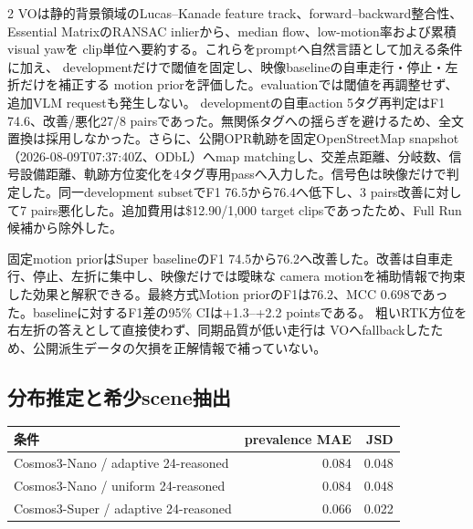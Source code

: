 \documentclass[9pt,a4paper]{extarticle}
\begin{document}
\begin{multicols}{2}
VOは静的背景領域のLucas--Kanade feature track、forward--backward整合性、
Essential MatrixのRANSAC inlierから、median flow、low-motion率および累積visual yawを
clip単位へ要約する。これらをpromptへ自然言語として加える条件に加え、
developmentだけで閾値を固定し、映像baselineの自車走行・停止・左折だけを補正する
motion priorを評価した。evaluationでは閾値を再調整せず、追加VLM requestも発生しない。
developmentの自車action 5タグ再判定はF1 74.6、改善/悪化27/8 pairsであった。無関係タグへの揺らぎを避けるため、全文置換は採用しなかった。さらに、公開OPR軌跡を固定OpenStreetMap snapshot\cite{openstreetmap2026}（2026-08-09T07:37:40Z、ODbL）へmap matchingし、交差点距離、分岐数、信号設備距離、軌跡方位変化を4タグ専用passへ入力した。信号色は映像だけで判定した。同一development subsetでF1 76.5から76.4へ低下し、3 pairs改善に対して7 pairs悪化した。追加費用は\$12.90/1,000 target clipsであったため、Full Run候補から除外した。
\begin{center}
\label{tab:public-motion}
\scriptsize
{}
\end{center}
固定motion priorはSuper baselineのF1 74.5から76.2へ改善した。改善は自車走行、停止、左折に集中し、映像だけでは曖昧な
camera motionを補助情報で拘束した効果と解釈できる。最終方式Motion priorのF1は76.2、MCC 0.698であった。baselineに対するF1差の95\% CIは+1.3--+2.2 pointsである。 粗いRTK方位を右左折の答えとして直接使わず、同期品質が低い走行は
VOへfallbackしたため、公開派生データの欠損を正解情報で補っていない。

\subsection{分布推定と希少scene抽出}
\begin{center}
\centering
{}
\label{tab:distribution}
\scriptsize
\begin{tabular}{lrr}
\toprule
条件 & prevalence MAE & JSD\\
\midrule
Cosmos3-Nano / adaptive 24-reasoned & 0.084 & 0.048 \\
Cosmos3-Nano / uniform 24-reasoned & 0.084 & 0.048 \\
Cosmos3-Super / adaptive 24-reasoned & 0.066 & 0.022 \\
\bottomrule
\end{tabular}
\end{center}


\end{multicols}
\end{document}
